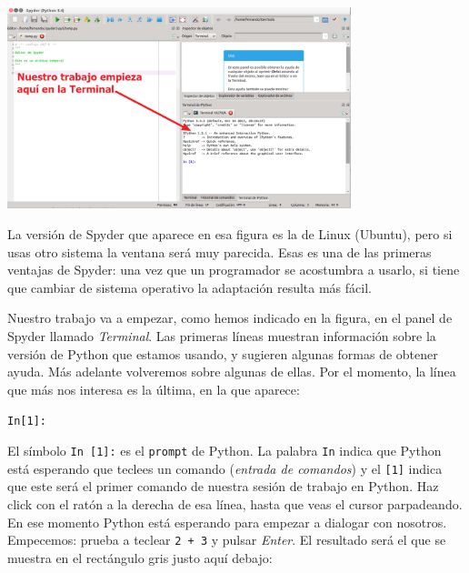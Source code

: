 \documentclass[10pt,a4paper]{article}\usepackage[]{graphicx}\usepackage[]{color}
\makeatletter
\newenvironment{kframe}{%
 \def\at@end@of@kframe{}%
 \ifinner\ifhmode%
  \def\at@end@of@kframe{\end{minipage}}%
  \begin{minipage}{\columnwidth}%
 \fi\fi%
 \def\FrameCommand##1{\hskip\@totalleftmargin \hskip-\fboxsep
 \colorbox{shadecolor}{##1}\hskip-\fboxsep
     \hskip-\linewidth \hskip-\@totalleftmargin \hskip\columnwidth}%
 \MakeFramed {\advance\hsize-\width
   \@totalleftmargin\z@ \linewidth\hsize
   \@setminipage}}%
 {\par\unskip\endMakeFramed%
 \at@end@of@kframe}
\newenvironment{knitrout}{}{} %
\makeatother
\begin{document}
\begin{center}
\includegraphics[width=10cm]{../fig/Tut-02-py-01-a-SpyderLinux.png}
\end{center}

La versión de Spyder que aparece en esa figura es la de Linux (Ubuntu), pero si usas otro sistema la ventana será muy parecida. Esas es una de las primeras ventajas de Spyder: una vez que un programador se acostumbra a usarlo, si tiene que cambiar de sistema operativo la adaptación resulta más fácil. 

Nuestro trabajo va a empezar, como hemos indicado en la figura, en el panel de Spyder llamado {\em Terminal}. Las primeras líneas muestran información sobre la versión de Python que estamos usando, y sugieren algunas formas de obtener ayuda. Más adelante volveremos sobre algunas de ellas. Por el momento, la línea que más nos interesa es la última, en la que aparece:
\begin{knitrout}
\color{fgcolor}\begin{kframe}
\begin{alltt}
In [1]:
\end{alltt}
\end{kframe}
\end{knitrout}
El símbolo {\tt In [1]:} es el {\tt prompt} de Python. La palabra {\tt In} indica que Python está esperando que teclees un comando ({\em entrada de comandos}) y el {\tt [1]} indica que este será el primer comando de nuestra sesión de trabajo en Python. Haz click con el ratón a la derecha de esa línea, hasta que veas el cursor parpadeando. En ese momento Python está esperando para empezar a dialogar con nosotros. Empecemos: prueba a teclear {\tt 2 + 3} y pulsar {\em Enter}. El resultado será el que se muestra en el rectángulo gris justo aquí debajo:
\end{document}
